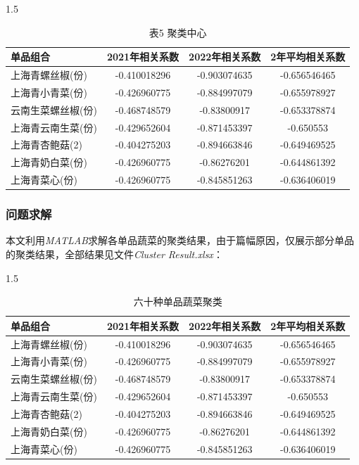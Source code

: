 \documentclass{article}
\begin{document}
	\begin{table}[h]
		\centering
		\caption*{表5 聚类中心}
		\renewcommand{\heavyrulewidth}{1.2pt}
		\begin{spacing}{1.5}
			\begin{tabular}{@{}lccc@{}}
				\toprule
				\textbf{单品组合} & \textbf{2021年相关系数} & \textbf{2022年相关系数} & \textbf{2年平均相关系数} \\
				\midrule
				上海青螺丝椒(份) & -0.410018296 & -0.903074635 & -0.656546465 \\
				上海青小青菜(份) & -0.426960775 & -0.884997079 & -0.655978927 \\
				云南生菜螺丝椒(份) & -0.468748579 & -0.83800917 & -0.653378874 \\
				上海青云南生菜(份) & -0.429652604 & -0.871453397 & -0.650553 \\
				上海青杏鲍菇(2) & -0.404275203 & -0.894663846 & -0.649469525 \\
				上海青奶白菜(份) & -0.426960775 & -0.86276201 & -0.644861392 \\
				上海青菜心(份) & -0.426960775 & -0.845851263 & -0.636406019 \\
				\bottomrule
			\end{tabular}
		\end{spacing}
		\renewcommand{\heavyrulewidth}{1.2pt}
	\end{table}
	
	\subsubsection{问题求解}
	
	本文利用\textit{MATLAB}求解各单品蔬菜的聚类结果，由于篇幅原因，仅展示部分单品的聚类结果，全部结果见文件\textit{Cluster Result.xlsx}：
	
	\begin{table}[h]
		\centering
		\caption{六十种单品蔬菜聚类}
		\renewcommand{\heavyrulewidth}{1.2pt}
		\begin{spacing}{1.5}
			\begin{tabular}{@{}lccc@{}}
				\toprule
				\textbf{单品组合} & \textbf{2021年相关系数} & \textbf{2022年相关系数} & \textbf{2年平均相关系数} \\
				\midrule
				上海青螺丝椒(份) & -0.410018296 & -0.903074635 & -0.656546465 \\
				上海青小青菜(份) & -0.426960775 & -0.884997079 & -0.655978927 \\
				云南生菜螺丝椒(份) & -0.468748579 & -0.83800917 & -0.653378874 \\
				上海青云南生菜(份) & -0.429652604 & -0.871453397 & -0.650553 \\
				上海青杏鲍菇(2) & -0.404275203 & -0.894663846 & -0.649469525 \\
				上海青奶白菜(份) & -0.426960775 & -0.86276201 & -0.644861392 \\
				上海青菜心(份) & -0.426960775 & -0.845851263 & -0.636406019 \\
				\bottomrule
			\end{tabular}
		\end{spacing}
		\renewcommand{\heavyrulewidth}{1.2pt}
	\end{table}
	
\end{document}
